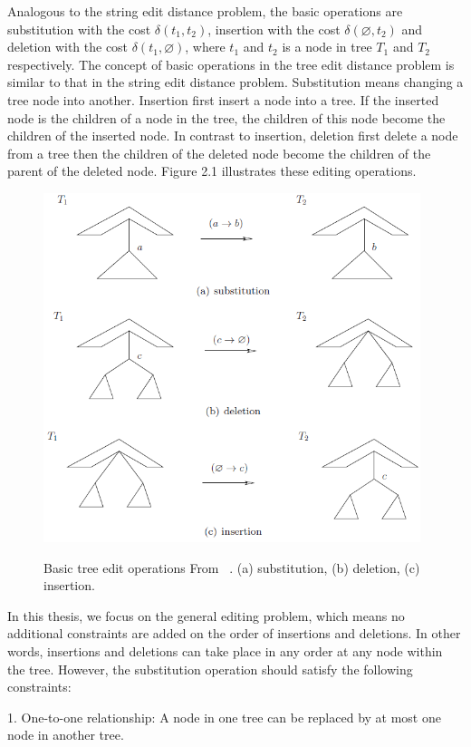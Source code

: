 Analogous to the string edit distance problem, the basic operations are substitution with the cost $\delta(t_1, t_2)$, insertion with the cost $\delta(\varnothing, t_2)$ and deletion with the cost $\delta(t_1, \varnothing)$, where $t_1$ and $t_2$ is a node in tree $T_1$ and $T_2$ respectively. The concept of basic operations in the tree edit distance problem is similar to that in the string edit distance problem. Substitution means changing a tree node into another. Insertion first insert a node into a tree. If the inserted node is the children of a node in the tree, the children of this node become the children of the inserted node. In contrast to insertion, deletion first delete a node from a tree then the children of the deleted node become the children of the parent of the deleted node. Figure 2.1 illustrates these editing operations.

\begin{figure}
		\centering
		\includegraphics[width=11cm,clip]{Figures/TreeEditingOperation}
		\label{Basic tree edit operations} 
		\caption{Basic tree edit operations From ~\cite{chen2015review}. (a) substitution, (b) deletion, (c) insertion.}
\end{figure}

In this thesis, we focus on the general editing problem, which means no additional constraints are added on the order of insertions and deletions. In other words, insertions and deletions can take place in any order at any node within the tree. However, the substitution operation should satisfy the following constraints:

1. One-to-one relationship: A node in one tree can be replaced by at most one node in another tree. 

